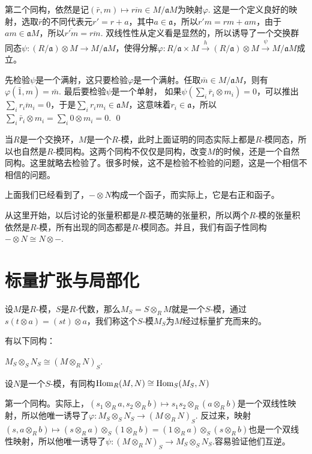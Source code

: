 	第二个同构，依然是记$(\bar{r},m)\mapsto \overline{rm}\in M/\mathfrak{a}M$为映射$\varphi$. 这是一个定义良好的映射，选取$\bar{r}$的不同代表元$r'=r+a$，其中$a\in\mathfrak{a}$，所以$r'm=rm+am$，由于$am\in \mathfrak{a}M$，所以$\overline{r'm}=\overline{rm}$. 双线性性从定义看是显然的，所以诱导了一个交换群同态$\psi:(R/\mathfrak{a})\otimes M\to M/\mathfrak{a}M$，使得分解$\varphi:R/\mathfrak{a}\times M\xrightarrow{h} (R/\mathfrak{a})\otimes M\xrightarrow{\psi} M/\mathfrak{a}M$成立。

	先检验$\psi$是一个满射，这只要检验$\varphi$是一个满射。任取$\bar{m}\in M/\mathfrak{a}M$，则有$\varphi(\bar{1},m)=\bar{m}$. 最后要检验$\psi$是一个单射，
	如果$\psi(\sum_i \bar{r}_i\otimes m_i)=0$，可以推出$\sum_i \overline{r_im_i}=0$，于是$\sum_i r_im_i \in \mathfrak{a}M$，这意味着$r_i\in \mathfrak{a}$，所以$\sum_i \bar{r}_i\otimes m_i=\sum_i 0\otimes m_i=0$.
\qed

当$R$是一个交换环，$M$是一个$R$-模，此时上面证明的同态实际上都是$R$-模同态，所以也自然是$R$-模同构。这两个同构不仅仅是同构，改变$M$的时候，还是一个自然同构。这里就略去检验了。很多时候，这不是检验不检验的问题，这是一个相信不相信的问题。

\para 上面我们已经看到了，$-\otimes N$构成一个函子，而实际上，它是右正和函子。

\para 从这里开始，以后讨论的张量积都是$R$-模范畴的张量积，所以两个$R$-模的张量积依然是$R$-模，所有出现的同态都是$R$-模同态。并且，我们有函子性同构$-\otimes N\cong N\otimes -$.

\section{标量扩张与局部化}

\para 设$M$是$R$-模，$S$是$R$-代数，那么$M_S=S\otimes_R M$就是一个$S$-模，通过$s(t\otimes a)=(st)\otimes a$，我们称这个$S$-模$M_S$为$M$经过标量扩充而来的。

\lem 有以下同构：

 $M_S\otimes_S N_S\cong (M\otimes_R N)_S$.

 设$N$是一个$S$-模，有同构$\operatorname{Hom}_R(M,N)\cong \operatorname{Hom}_S(M_S,N)$

\proof 第一个同构。实际上，$(s_1\otimes_R a,s_2\otimes_R b)\mapsto s_1s_2\otimes_R(a\otimes_R b)$是一个双线性映射，所以他唯一诱导了$\varphi:M_S\otimes_S N_S\to (M\otimes_R N)_S$. 反过来，映射$(s,a\otimes_R b)\mapsto (s\otimes_R a)\otimes_S (1\otimes_R b)=(1\otimes_R a)\otimes_S (s\otimes_R b)$也是一个双线性映射，所以他唯一诱导了$\psi:(M\otimes_R N)_S\to M_S\otimes_S N_S$.容易验证他们互逆。

